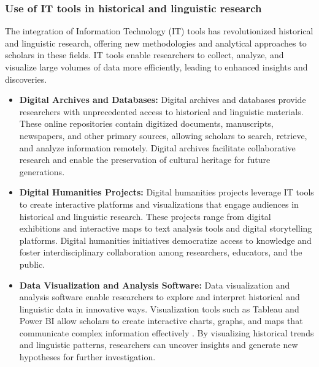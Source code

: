 \subsubsection{Use of IT tools in historical and linguistic research}
The integration of Information Technology (IT) tools has revolutionized historical and linguistic research, offering new methodologies and analytical approaches to scholars in these fields. IT tools enable researchers to collect, analyze, and visualize large volumes of data more efficiently, leading to enhanced insights and discoveries.
\begin{itemize}
    \item \textbf{Digital Archives and Databases:}
    Digital archives and databases provide researchers with unprecedented access to historical and linguistic materials. These online repositories contain digitized documents, manuscripts, newspapers, and other primary sources, allowing scholars to search, retrieve, and analyze information remotely. Digital archives facilitate collaborative research and enable the preservation of cultural heritage for future generations.
		\item \textbf{Digital Humanities Projects:}
		Digital humanities projects leverage IT tools to create interactive platforms and visualizations that engage audiences in historical and linguistic research. These projects range from digital exhibitions and interactive maps to text analysis tools and digital storytelling platforms\cite{Bolstad}. Digital humanities initiatives democratize access to knowledge and foster interdisciplinary collaboration among researchers, educators, and the public.
		\item \textbf{Data Visualization and Analysis Software:}
        Data visualization and analysis software enable researchers to explore and interpret historical and linguistic data in innovative ways. Visualization tools such as Tableau and Power BI allow scholars to create interactive charts, graphs, and maps that communicate complex information effectively \cite{Few}. By visualizing historical trends and linguistic patterns, researchers can uncover insights and generate new hypotheses for further investigation.
\end{itemize}
